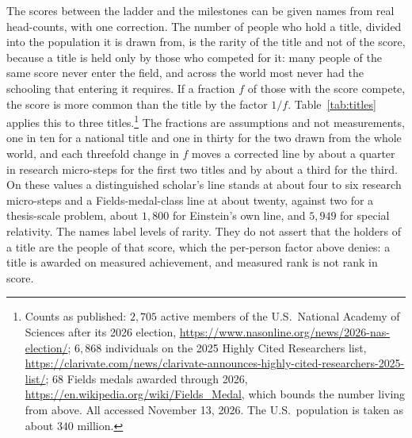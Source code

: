 \documentclass{article}
\begin{document}
The scores between the ladder and the milestones can be given names from real head-counts, with one correction. The number of people who hold a title, divided into the population it is drawn from, is the rarity of the title and not of the score, because a title is held only by those who competed for it: many people of the same score never enter the field, and across the world most never had the schooling that entering it requires. If a fraction $f$ of those with the score compete, the score is more common than the title by the factor $1/f$. Table~\ref{tab:titles} applies this to three titles.\footnote{Counts as published: $2{,}705$ active members of the U.S.\ National Academy of Sciences after its 2026 election, \url{https://www.nasonline.org/news/2026-nas-election/}; $6{,}868$ individuals on the 2025 Highly Cited Researchers list, \url{https://clarivate.com/news/clarivate-announces-highly-cited-researchers-2025-list/}; $68$ Fields medals awarded through 2026, \url{https://en.wikipedia.org/wiki/Fields_Medal}, which bounds the number living from above. All accessed November 13, 2026. The U.S.\ population is taken as about $340$ million.} The fractions are assumptions and not measurements, one in ten for a national title and one in thirty for the two drawn from the whole world, and each threefold change in $f$ moves a corrected line by about a quarter in research micro-steps for the first two titles and by about a third for the third. On these values a distinguished scholar's line stands at about four to six research micro-steps and a Fields-medal-class line at about twenty, against two for a thesis-scale problem, about $1{,}800$ for Einstein's own line, and $5{,}949$ for special relativity. The names label levels of rarity. They do not assert that the holders of a title are the people of that score, which the per-person factor above denies: a title is awarded on measured achievement, and measured rank is not rank in score.
\end{document}

